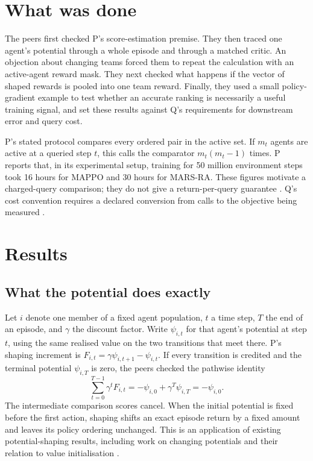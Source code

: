 \documentclass{article}
\begin{document}
\section{What was done}

The peers first checked P's score-estimation premise. They then traced one agent's potential through a whole
episode and through a matched critic. An objection about changing teams forced them to repeat the calculation
with an active-agent reward mask. They next checked what happens if the vector of shaped rewards is pooled
into one team reward. Finally, they used a small policy-gradient example to test whether an accurate ranking
is necessarily a useful training signal, and set these results against Q's requirements for downstream error
and query cost.

P's stated protocol compares every ordered pair in the active set. If \(m_t\) agents are active at a queried
step \(t\), this calls the comparator \(m_t(m_t-1)\) times. P reports that, in its experimental setup,
training for 50 million environment steps took 16 hours for MAPPO and 30 hours for MARS-RA. These figures
motivate a charged-query comparison; they do not give a return-per-query guarantee \cite{P}. Q's cost
convention requires a declared conversion from calls to the objective being measured \cite{Q}.

\section{Results}

\subsection{What the potential does exactly}

Let \(i\) denote one member of a fixed agent population, \(t\) a time step, \(T\) the end of an episode, and
\(\gamma\) the discount factor. Write \(\psi_{i,t}\) for that agent's potential at step \(t\), using the same
realised value on the two transitions that meet there. P's shaping increment is
\(F_{i,t}=\gamma\psi_{i,t+1}-\psi_{i,t}\). If every transition is credited and the terminal potential
\(\psi_{i,T}\) is zero, the peers checked the pathwise identity
\[
\sum_{t=0}^{T-1}\gamma^t F_{i,t}
=-\psi_{i,0}+\gamma^T\psi_{i,T}
=-\psi_{i,0}.
\]
The intermediate comparison scores cancel. When the initial potential is fixed before the first action,
shaping shifts an exact episode return by a fixed amount and leaves its policy ordering unchanged. This is an
application of existing potential-shaping results, including work on changing potentials and their relation to
value initialisation \cite{dynamicArchive,dynamicConference,wiewiora}.
\end{document}
